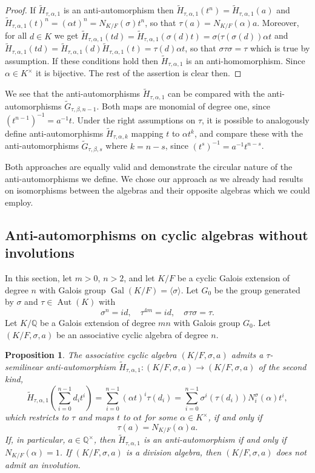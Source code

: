 \documentclass{amsart}
\theoremstyle{plain}
\newtheorem{proposition}[theorem]{Proposition}
\theoremstyle{definition}
\numberwithin{equation}{section}
\numberwithin{figure}{section}
\DeclareMathOperator{\Gal}{Gal}
\DeclareMathOperator{\Aut}{Aut}
\begin{document}
 \begin{proof}
 If $\widetilde H_{\tau,\alpha,1}$ is an anti-automorphism then $\widetilde H_{\tau,\alpha,1}(t^n)=\widetilde H_{\tau,\alpha,1}(a)$ and $\widetilde H_{\tau,\alpha,1}(t)^n= (\alpha t)^n=N_{K/F}(\sigma)t^n$, so that $\tau(a)=N_{K/F}(\alpha) a.$ Moreover, for all $d\in K$ we get
 $\widetilde H_{\tau,\alpha,1}(td)=\widetilde H_{\tau,\alpha,1}(\sigma(d)t)=\sigma(\tau(\sigma(d)) \alpha t$
 and $\widetilde H_{\tau,\alpha,1}(td)=\widetilde H_{\tau,\alpha,1}(d)\widetilde H_{\tau,\alpha,1}(t)=\tau(d) \alpha t$, so that
 $\sigma\tau\sigma=\tau$ which is true by assumption. If these conditions hold then $\widetilde H_{\tau,\alpha,1}$ is an anti-homomorphism. Since $\alpha\in K^\times$ it is bijective. The rest of the assertion is clear then.
 \end{proof}
 
 We see that the  anti-automorphisms $\widetilde H_{\tau,\alpha,1}$ can be compared with the anti-automorphisms $\widetilde G_{\tau,\beta,n-1}$. Both maps are monomial of degree one, since $(t^{n-1})^{-1}=a^{-1}t$.
  Under the right assumptions on $\tau$, it is possible to analogously define anti-automorphisms $\widetilde H_{\tau,\alpha,k}$ mapping $t$ to  $\alpha t^k$, and compare these with the anti-automorphisms $\widetilde G_{\tau,\beta,s}$ where $k=n-s$, since $(t^{s})^{-1}=a^{-1}t^{n-s}$.
  
  Both approaches are equally valid and demonstrate the circular nature of the anti-automorphisms we define. We chose our approach as we already had results on isomorphisms between the algebras and their opposite algebras which we could employ.


\subsection{Anti-automorphisms  on cyclic algebras without involutions}

In this section, let $m>0$, $n>2$, and let $K/F$ be a cyclic Galois extension of degree $n$ with Galois group $ \Gal(K/F)=\langle \sigma\rangle$. Let $G_0$ be the group generated by $\sigma$ and $\tau\in \Aut(K)$ with $$\sigma^n=id, \quad\tau^{4m}=id, \quad \sigma\tau\sigma=\tau.$$
 Let $K/\mathbb{Q}$ be a  Galois extension of degree $mn$ with Galois group $G_0$.
  Let $(K/F,\sigma,a)$ be an associative cyclic algebra of degree $n$.


 \begin{proposition}\label{prop:Pat0} 
 The associative cyclic algebra $(K/F,\sigma,a)$ admits a $\tau$-semilinear anti-automorphism $\widetilde H_{\tau,\alpha,1}:(K/F,\sigma,a) \to (K/F,\sigma,a)$  of the second kind,
 $$\widetilde H_{\tau,\alpha,1}(\sum_{i=0}^{n-1}d_it^i)=\sum_{i=0}^{n-1}   (\alpha t)^i \tau(d_i)=\sum_{i=0}^{n-1} \sigma^i(\tau(d_i) ) N_i^\sigma(\alpha) t^i,$$
 which restricts to $\tau$ and maps $t$ to $\alpha t$ for some $\alpha\in K^\times$, if and only if
 $$\tau(a)=N_{K/F}(\alpha) a.$$
 If, in particular, $a\in \mathbb{Q}^\times$, then $\widetilde H_{\tau,\alpha,1}$ is an anti-automorphism if and only if $N_{K/F}(\alpha)=1$.
If $(K/F,\sigma,a)$ is a division algebra, then $(K/F,\sigma,a)$ does not admit an involution.
   \end{proposition}
\end{document}
